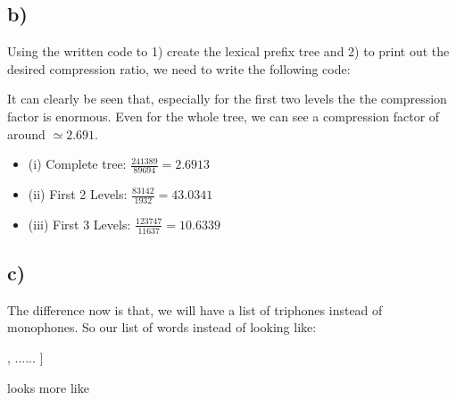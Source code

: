\subsection*{b)} %
\label{sub:b}

Using the written code to 1) create the lexical prefix tree and 
2) to print out the desired compression ratio, we need to write the 
following code:


It can clearly be seen that, especially for the first two levels the the compression factor is enormous.
Even for the whole tree, we can see a compression factor of around $\simeq 2.691$.

\begin{itemize}
	\item (i) Complete tree: $\frac{241389}{89694} = 2.6913$
	\item (ii) First 2 Levels: $\frac{83142}{1932} = 43.0341$
	\item (iii) First 3 Levels: $\frac{123747}{11637} = 10.6339$
\end{itemize}



\subsection*{c)} %
\label{sub:c_}

The difference now is that, we will have a list of triphones instead of monophones. So our list of words instead of looking like:

\begin{python}
[
	['jh','uw','l'],
	......
]
\end{python}


looks more like

